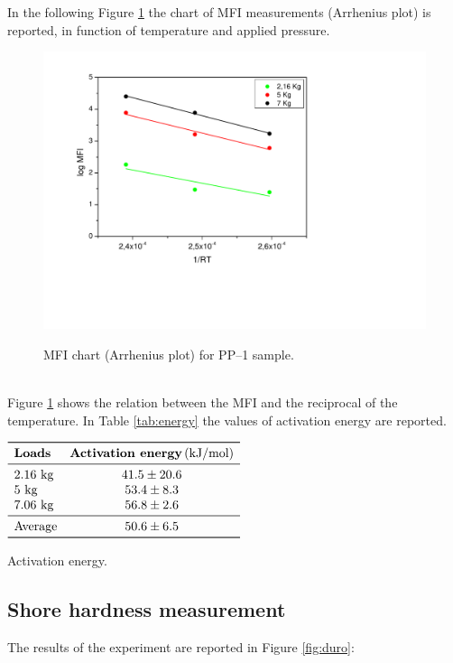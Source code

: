 \documentclass[a4paper, 11pt]{article}
\begin{document}
In the following Figure \ref{fig:arrhenius} the chart of MFI measurements (Arrhenius plot) is reported, in function of temperature and applied pressure. 
\begin{figure}[h!]
	\centering
	{\includegraphics[scale=0.4]{arrhenius}}
	\captionsetup{justification=centering}
	\caption{MFI chart (Arrhenius plot) for PP–1 sample.}
	\label{fig:arrhenius}
\end{figure}\\
Figure \ref{fig:arrhenius} shows the relation between the MFI and the reciprocal of the temperature. In Table \ref{tab:energy} the values of activation energy are reported.
\begin{table}[htp]
\centering
$
\begin{array}{lc}
\toprule
\textbf{Loads} & \textbf{Activation energy} \, \text{(kJ/mol)}  \\
\midrule
\text{2.16 kg} & 41.5 \pm 20.6  \\
\text{5 kg} & 53.4 \pm 8.3 \\
\text{7.06 kg} & 56.8 \pm 2.6  \\
\midrule
\text{Average} & 50.6 \pm 6.5 \\
\bottomrule
\end{array}
$
\caption{Activation energy.}
\label{tab:energy}
\end{table}

\subsection{Shore hardness measurement}

The results of the experiment are reported in Figure \ref{fig:duro}:
\end{document}

